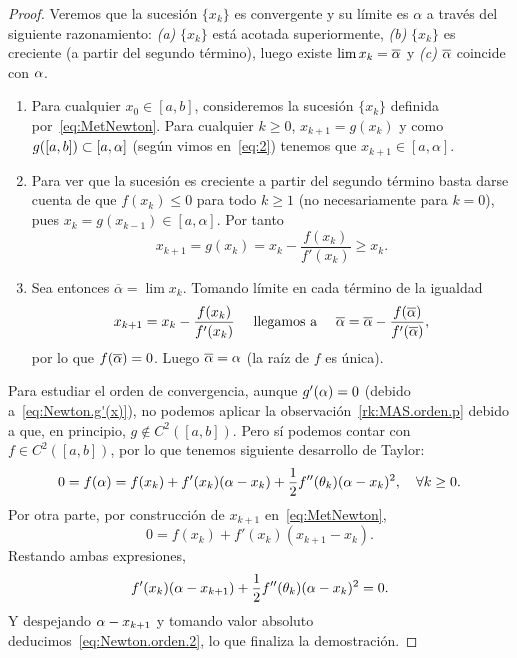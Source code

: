 \begin{proof}
  Veremos que la sucesión $\{x_k\}$ es convergente y su límite es
  $\alpha$ a través del siguiente razonamiento: \textit{(a)} $\{x_k\}$
  está acotada superiormente, \textit{(b)} $\{x_k\}$ es creciente (a
  partir del segundo término), luego existe $\lim x_k=\overline{\alpha}$
  y \textit{(c)} $\overline{\alpha}$ coincide con $\alpha$.
  \begin{enumerate}[label=\emph{(\alph*)}]
  \item Para cualquier $x_0\in[a,b]$, consideremos la sucesión
    $\{x_k\}$ definida por~\eqref{eq:MetNewton}. Para cualquier $k\ge
    0$, $x_{k+1}=g(x_{k})$ y como $g([a,b])\subset [a,\alpha]$
    (según vimos en~\eqref{eq:2}) tenemos que
    $x_{k+1}\in [a,\alpha]$.
  \item Para ver que la sucesión es creciente a partir del segundo
    término basta darse cuenta de que $f(x_k)\le 0$ para todo $k\ge 1$
    (no necesariamente para $k=0$), pues $x_k=g(x_{k-1})\in
    [a,\alpha]$. Por tanto
    $$
    x_{k+1}=g(x_k)=x_k - \frac{f(x_k)}{f'(x_k)} \ge x_k.
    $$
  \item Sea entonces $\overline\alpha = \lim x_k$. Tomando límite en cada
    término de la igualdad
    \begin{equation*}
      x_{k+1}=x_k- \frac{f(x_k)}{f'(x_k)}
    \quad\text{ llegamos a }\quad
      \overline{\alpha} = \overline{\alpha} -
      \frac{f(\overline{\alpha})}{f'(\overline{\alpha})},
    \end{equation*}
    por lo que $f(\overline{\alpha})=0$. Luego $\overline{\alpha}=\alpha$ (la
    raíz de $f$ es única).
  \end{enumerate}

  Para estudiar el orden de convergencia, aunque $g'(\alpha)=0$ (debido
  a~\eqref{eq:Newton.g'(x)}), no podemos aplicar la
  observación~\ref{rk:MAS.orden.p} debido a que, en principio,
  $g\not\in C^2([a,b])$. Pero sí podemos contar con $f\in C^2([a,b])$,
  por lo que tenemos siguiente desarrollo de Taylor:
  \begin{equation*}
    0 = f(\alpha)=f(x_k)+f'(x_k)(\alpha-x_k)+\frac12 f''(\theta_k)(\alpha-x_k)^2,
    \quad\forall k\ge 0.
  \end{equation*}
  Por otra parte, por construcción de $x_{k+1}$ en~\eqref{eq:MetNewton},
  \begin{equation*}
    0=f(x_k)+f'(x_k)(x_{k+1}-x_k).
  \end{equation*}
  Restando ambas expresiones,
  \begin{equation*}
    f'(x_k)(\alpha-x_{k+1}) + \frac12 f''(\theta_k)(\alpha-x_k)^2 = 0.
  \end{equation*}
  Y despejando $\alpha-x_{k+1}$ y tomando valor absoluto
  deducimos~\eqref{eq:Newton.orden.2}, lo que finaliza la demostración.
\end{proof}

